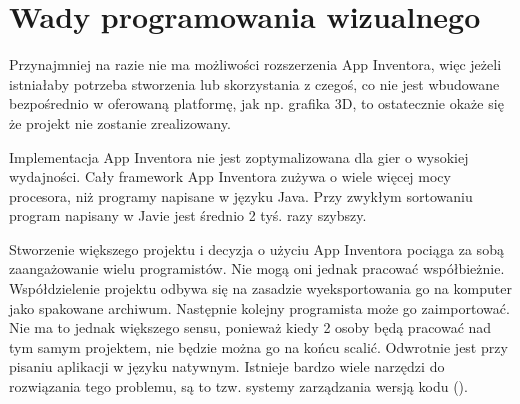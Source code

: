 \section{Wady programowania wizualnego}

Przynajmniej na razie nie ma możliwości rozszerzenia App Inventora, więc jeżeli istniałaby potrzeba stworzenia lub skorzystania z czegoś, co nie jest wbudowane bezpośrednio w oferowaną platformę, jak np. grafika 3D, to ostatecznie okaże się że projekt nie zostanie zrealizowany.

Implementacja App Inventora nie jest zoptymalizowana dla gier o wysokiej wydajności. Cały framework App Inventora zużywa o wiele więcej mocy procesora, niż programy napisane w języku Java. Przy zwykłym sortowaniu program napisany w Javie jest średnio 2 tyś. razy szybszy.

Stworzenie większego projektu i decyzja o użyciu App Inventora pociąga za sobą zaangażowanie wielu programistów. Nie mogą oni jednak pracować współbieżnie. Współdzielenie projektu odbywa się na zasadzie wyeksportowania go na komputer jako spakowane archiwum. Następnie kolejny programista może go zaimportować. Nie ma to jednak większego sensu, ponieważ kiedy 2 osoby będą pracować nad tym samym projektem, nie będzie można go na końcu scalić. Odwrotnie jest przy pisaniu aplikacji w języku natywnym. Istnieje bardzo wiele narzędzi do rozwiązania tego problemu, są to tzw. systemy zarządzania wersją kodu ().
